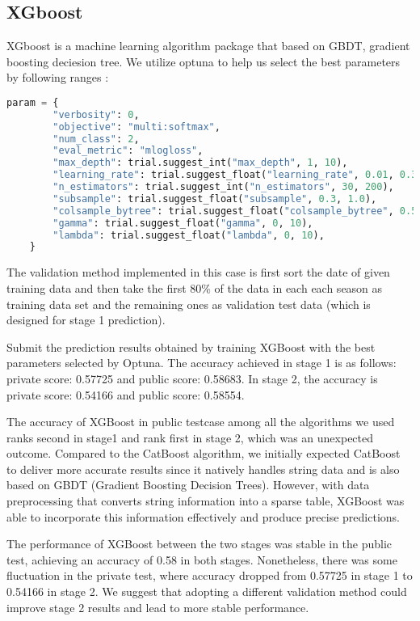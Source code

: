 \subsection*{XGboost}
\quad XGboost is a machine learning algorithm package that based on GBDT, gradient boosting deciesion tree. 
We utilize optuna to help us select the best parameters by following ranges :
\begin{lstlisting}[language=Python]
    param = {
        "verbosity": 0,
        "objective": "multi:softmax",
        "num_class": 2,
        "eval_metric": "mlogloss",
        "max_depth": trial.suggest_int("max_depth", 1, 10),
        "learning_rate": trial.suggest_float("learning_rate", 0.01, 0.3),
        "n_estimators": trial.suggest_int("n_estimators", 30, 200),
        "subsample": trial.suggest_float("subsample", 0.3, 1.0),
        "colsample_bytree": trial.suggest_float("colsample_bytree", 0.5, 1.0),
        "gamma": trial.suggest_float("gamma", 0, 10),
        "lambda": trial.suggest_float("lambda", 0, 10),
    }
\end{lstlisting}
\quad The validation method implemented in this case is first sort the date of given training data and then take the first 80\% 
of the data in each each season as training data set and the remaining ones as validation test data (which is designed for stage 1 prediction).

Submit the prediction results obtained by training XGBoost with the best parameters selected by Optuna. 
The accuracy achieved in stage 1 is as follows: private score: 0.57725 and public score: 0.58683. In stage 2,
 the accuracy is private score: 0.54166 and public score: 0.58554. 

 The accuracy of XGBoost in public testcase among all the algorithms we used ranks second in stage1 and rank first in stage 2, which was an unexpected outcome. Compared to the CatBoost algorithm, we initially expected CatBoost to deliver more accurate results since it natively handles string data and is also based on GBDT (Gradient Boosting Decision Trees). However, with data preprocessing that converts string information into a sparse table, XGBoost was able to incorporate this information effectively and produce precise predictions.

The performance of XGBoost between the two stages was stable in the public test, achieving an accuracy of 0.58 in both stages. Nonetheless, there was some fluctuation in the private test, where accuracy dropped from 0.57725 in stage 1 to 0.54166 in stage 2. We suggest that adopting a different validation method could improve stage 2 results and lead to more stable performance.

